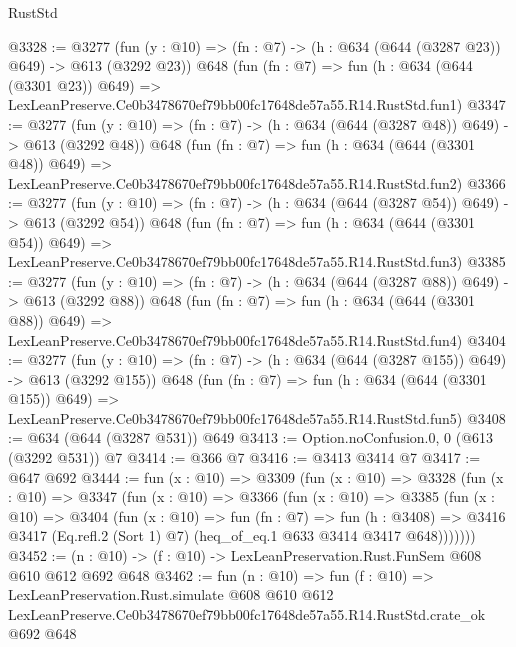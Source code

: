 \begin{lexlean}{RustStd}
\begin{coremodule}
@3328 := @3277
    (fun (y : @10) => (fn : @7) -> (h : @634 (@644 (@3287 @23)) @649) -> @613 (@3292 @23))
    @648
    (fun (fn : @7) =>
    fun (h : @634 (@644 (@3301 @23)) @649) =>
    LexLeanPreserve.Ce0b3478670ef79bb00fc17648de57a55.R14.RustStd.fun1)
@3347 := @3277
    (fun (y : @10) => (fn : @7) -> (h : @634 (@644 (@3287 @48)) @649) -> @613 (@3292 @48))
    @648
    (fun (fn : @7) =>
    fun (h : @634 (@644 (@3301 @48)) @649) =>
    LexLeanPreserve.Ce0b3478670ef79bb00fc17648de57a55.R14.RustStd.fun2)
@3366 := @3277
    (fun (y : @10) => (fn : @7) -> (h : @634 (@644 (@3287 @54)) @649) -> @613 (@3292 @54))
    @648
    (fun (fn : @7) =>
    fun (h : @634 (@644 (@3301 @54)) @649) =>
    LexLeanPreserve.Ce0b3478670ef79bb00fc17648de57a55.R14.RustStd.fun3)
@3385 := @3277
    (fun (y : @10) => (fn : @7) -> (h : @634 (@644 (@3287 @88)) @649) -> @613 (@3292 @88))
    @648
    (fun (fn : @7) =>
    fun (h : @634 (@644 (@3301 @88)) @649) =>
    LexLeanPreserve.Ce0b3478670ef79bb00fc17648de57a55.R14.RustStd.fun4)
@3404 := @3277
    (fun (y : @10) => (fn : @7) -> (h : @634 (@644 (@3287 @155)) @649) -> @613 (@3292 @155))
    @648
    (fun (fn : @7) =>
    fun (h : @634 (@644 (@3301 @155)) @649) =>
    LexLeanPreserve.Ce0b3478670ef79bb00fc17648de57a55.R14.RustStd.fun5)
@3408 := @634 (@644 (@3287 @531)) @649
@3413 := Option.noConfusion.{0, 0} (@613 (@3292 @531)) @7
@3414 := @366 @7
@3416 := @3413 @3414 @7
@3417 := @647 @692
@3444 := fun (x : @10) =>
  @3309
    (fun (x : @10) =>
    @3328
      (fun (x : @10) =>
      @3347
        (fun (x : @10) =>
        @3366
          (fun (x : @10) =>
          @3385
            (fun (x : @10) =>
            @3404
              (fun (x : @10) =>
              fun (fn : @7) =>
              fun (h : @3408) =>
              @3416 @3417 (Eq.refl.{2} (Sort 1) @7) (heq_of_eq.{1} @633 @3414 @3417 @648)))))))
@3452 := (n : @10) -> (f : @10) -> LexLeanPreservation.Rust.FunSem @608 @610 @612 @692 @648
@3462 := fun (n : @10) =>
  fun (f : @10) =>
  LexLeanPreservation.Rust.simulate
    @608
    @610
    @612
    LexLeanPreserve.Ce0b3478670ef79bb00fc17648de57a55.R14.RustStd.crate_ok
    @692
    @648
\end{coremodule}
\end{lexlean}
